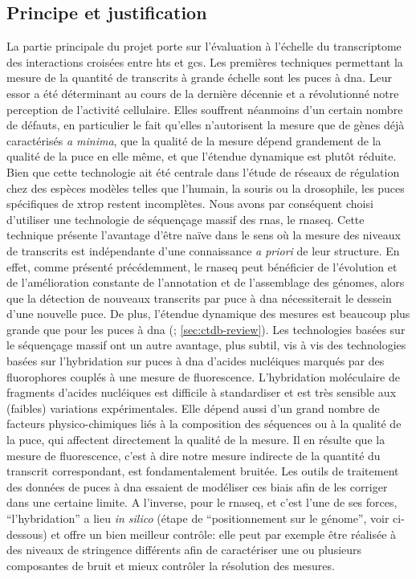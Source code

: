 \documentclass[../main.tex]{subfiles}
\begin{document}
	\subsection{Principe et justification}
		La partie principale du projet porte sur l'évaluation à l'échelle du transcriptome des interactions croisées entre \glspl{ht} et \glspl{gc}.
		Les premières techniques permettant la mesure de la quantité de transcrits à grande échelle sont les puces à \gls{dna}.
		Leur essor a été déterminant au cours de la dernière décennie et a révolutionné notre perception de l'activité cellulaire.
		Elles souffrent néanmoins d'un certain nombre de défauts, en particulier le fait qu'elles n'autorisent la mesure que de gènes déjà caractérisés \textit{a minima}, que la qualité de la mesure dépend grandement de la qualité de la puce en elle même, et que l'étendue dynamique est plutôt réduite.
		Bien que cette technologie ait été centrale dans l'étude de réseaux de régulation chez des espèces modèles telles que l'humain, la souris ou la drosophile, les puces spécifiques de \gls{xtrop} restent incomplètes.
		Nous avons par conséquent choisi d'utiliser une technologie de séquençage massif des \glspl{rna}, le \gls{rnaseq}.
		Cette technique présente l'avantage d'être naïve dans le sens où la mesure des niveaux de transcrits est indépendante d'une connaissance \textit{a priori} de leur structure.
		En effet, comme présenté précédemment, le \gls{rnaseq} peut bénéficier de l'évolution et de l'amélioration constante de l'annotation et de l'assemblage des génomes, alors que la détection de nouveaux transcrits par puce à \gls{dna} nécessiterait le dessein d'une nouvelle puce.
		De plus, l'étendue dynamique des mesures est beaucoup plus grande que pour les puces à \gls{dna} (\citealp{Grimaldi2013}; \autoref{sec:ctdb-review}).
		Les technologies basées sur le séquençage massif ont un autre avantage, plus subtil, vis à vis des technologies basées sur l'hybridation sur puces à \gls{dna} d'acides nucléiques marqués par des fluorophores couplés à une mesure de fluorescence.
		L'hybridation moléculaire de fragments d'acides nucléiques est difficile à standardiser et est très sensible aux (faibles) variations expérimentales.
		Elle dépend aussi d'un grand nombre de facteurs physico-chimiques liés à la composition des séquences ou à la qualité de la puce, qui affectent directement la qualité de la mesure.
		Il en résulte que la mesure de fluorescence, c'est à dire notre mesure indirecte de la quantité du transcrit correspondant, est fondamentalement bruitée.
		Les outils de traitement des données de puces à \gls{dna} essaient de modéliser ces biais afin de les corriger dans une certaine limite.
		A l'inverse, pour le \gls{rnaseq}, et c'est l'une de ses forces, ``l'hybridation'' a lieu \textit{in silico} (étape de ``positionnement sur le génome'', voir ci-dessous) et offre un bien meilleur contrôle: elle peut par exemple être réalisée à des niveaux de stringence différents afin de caractériser une ou plusieurs composantes de bruit et mieux contrôler la résolution des mesures.
\end{document}
